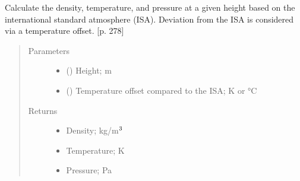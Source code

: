 \documentclass[letterpaper,10pt,english]{sphinxmanual}
\begin{document}
\begin{fulllineitems}
\label{\detokenize{modules/mission:mission.atmosphere}}
\sphinxAtStartPar
Calculate the density, temperature, and pressure at a given height
based on the international standard atmosphere (ISA). Deviation from
the ISA is considered via a temperature offset. {[}p. 278{]}
\begin{quote}\begin{description}
\item[{Parameters}] \leavevmode\begin{itemize}
\item {} 
\sphinxAtStartPar
{} () \textendash{} Height; m

\item {} 
\sphinxAtStartPar
{} () \textendash{} Temperature offset compared to the ISA; K or °C

\end{itemize}

\item[{Returns}] \leavevmode
\sphinxAtStartPar
\begin{itemize}
\item {} 
\sphinxAtStartPar
{} \textendash{} Density; kg/m\(\sp{\text{3}}\)

\item {} 
\sphinxAtStartPar
{} \textendash{} Temperature; K

\item {} 
\sphinxAtStartPar
{} \textendash{} Pressure; Pa

\end{itemize}


\end{description}\end{quote}

\end{fulllineitems}

\end{document}
